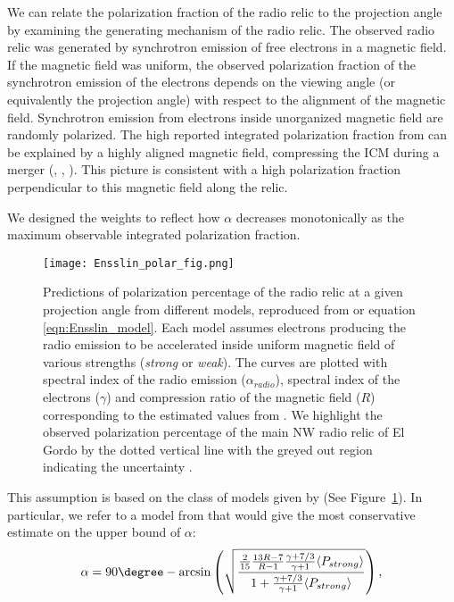 We can relate the polarization fraction of the radio relic to the
projection angle by examining the
generating mechanism of the radio relic.
The observed radio relic was generated by synchrotron emission of free electrons in a
magnetic field. If the magnetic field was uniform, the observed
polarization fraction of the synchrotron emission of the electrons depends on the
viewing angle (or equivalently the projection angle) with respect to the
alignment of the magnetic field. Synchrotron emission from electrons inside unorganized magnetic field are
randomly polarized. The high reported integrated polarization fraction from
\citet{L13} can be explained by a highly aligned magnetic field,
compressing the ICM during a merger
(\citealt{E98}, \citealt{vanWeeren10}, \citealt{Feretti12}).
This picture is consistent with a high polarization fraction perpendicular
to this magnetic field along the relic. 
\par
We designed the weights to reflect how $\alpha$ decreases monotonically as the
maximum observable integrated polarization fraction. 
\begin{figure}
	\texttt{[image: Ensslin\_polar\_fig.png]}
	\caption{Predictions of polarization percentage of the radio relic at a
		given projection angle from different models, reproduced from
		\citep{E98} or equation \ref{eqn:Ensslin_model}. Each model assumes electrons producing the radio emission
		to be accelerated inside uniform magnetic field of various strengths ({\it strong} or 
		{\it weak}). The curves are plotted with spectral index of the radio emission
		($\alpha_{radio}$), spectral index of the electrons ($\gamma$) and
		compression ratio of the magnetic field ($R$) corresponding to the
		estimated values from \citet{L13}.
		We highlight the observed polarization percentage of the main NW radio relic
		of El Gordo by the dotted vertical line with the greyed out region
		indicating the uncertainty \citep{L13}.\label{fig:Ensslin_fig}}
\end{figure}
This assumption is based on the class of models given by \cite{E98}(See
Figure~\ref{fig:Ensslin_fig}). In particular, we refer to a model from \cite{E98} 
that would give the most
conservative estimate on the upper bound of $\alpha$:
\begin{equation}
	\alpha = 90 \degree - \arcsin \left( \sqrt{\frac{\frac{2}{15} \frac{13R -
	7}{R - 1} \frac{\gamma + 7/3}{\gamma + 1} \langle P_{strong} \rangle}{1 +
		\frac{\gamma + 7/3}{\gamma +1} \langle P_{strong} \rangle
	}}\right),\label{eqn:Ensslin_model}
\end{equation}
